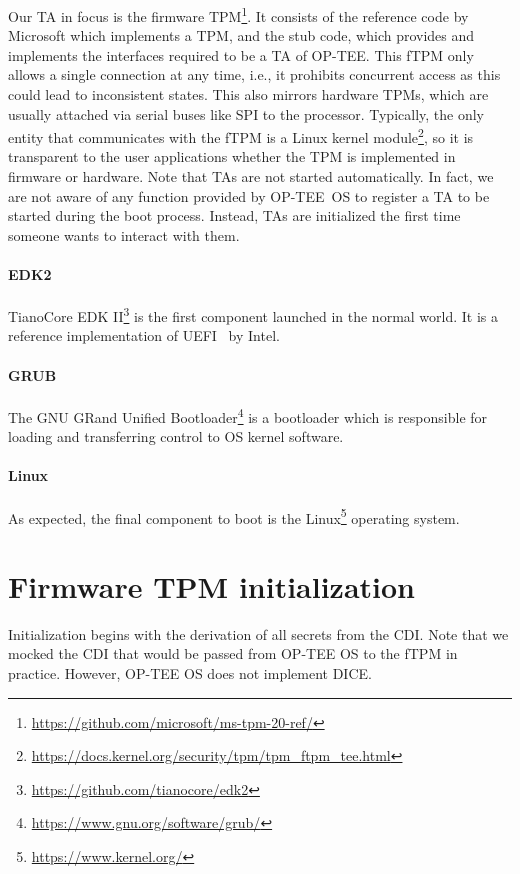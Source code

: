 Our TA in focus is the firmware TPM\footnote{\url{https://github.com/microsoft/ms-tpm-20-ref/}}\@.
It consists of the reference code by Microsoft which implements a TPM, and the stub code, which provides and implements the interfaces required to be a TA of OP-TEE\@.
This fTPM only allows a single connection at any time, i.e., it prohibits concurrent access as this could lead to inconsistent states.
This also mirrors hardware TPMs, which are usually attached via serial buses like SPI to the processor.
Typically, the only entity that communicates with the fTPM is a Linux kernel module\footnote{\url{https://docs.kernel.org/security/tpm/tpm_ftpm_tee.html}}, so it is transparent to the user applications whether the TPM is implemented in firmware or hardware.
Note that TAs are not started automatically.
In fact, we are not aware of any function provided by OP-TEE~OS to register a TA to be started during the boot process. 
Instead, TAs are initialized the first time someone wants to interact with them.

\paragraph{EDK2}
TianoCore EDK II\footnote{\url{https://github.com/tianocore/edk2}} is the first component launched in the normal world.
It is a reference implementation of UEFI~\cite{UEFI} by Intel.

\paragraph{GRUB}
The GNU GRand Unified Bootloader\footnote{\url{https://www.gnu.org/software/grub/}} is a bootloader which is responsible for loading and transferring control to OS kernel software.

\paragraph{Linux}
As expected, the final component to boot is the Linux\footnote{\url{https://www.kernel.org/}} operating system.

\section{Firmware TPM initialization}

Initialization begins with the derivation of all secrets from the CDI\@.
Note that we mocked the CDI that would be passed from OP-TEE OS to the fTPM in practice.
However, OP-TEE OS does not implement DICE\@.

